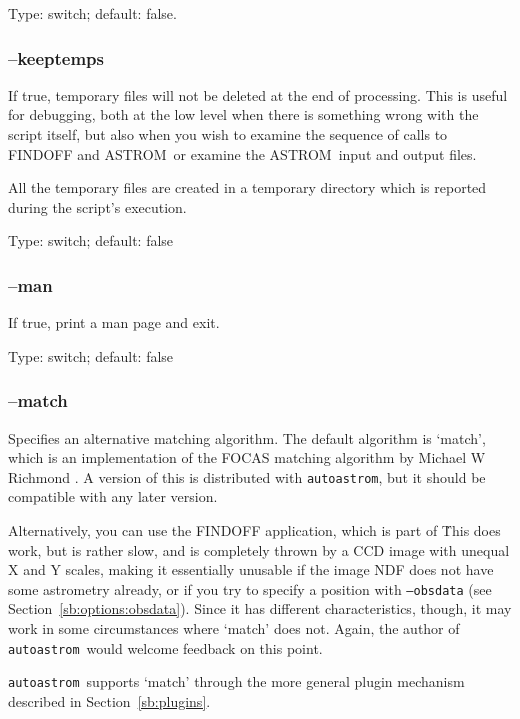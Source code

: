 \documentclass[twoside,11pt,nolof]{starlink}
\providecommand{\ASTROM}{{\footnotesize ASTROM}\normalsize}
\providecommand{\autoastrom}{\texttt{autoastrom}}
\providecommand{\CCDPACKref}{\xref{{\footnotesize CCDPACK}}{sun139}{}}
\begin{document}
Type: switch; default: false.

\subsubsection{--keeptemps\label{sb:options:keeptemps}}

If true, temporary files will not be deleted at the end of processing.  This
is useful for debugging, both at the low level when there is something wrong
with the script itself, but also when you wish to examine the sequence of
calls to FINDOFF and \ASTROM\, or examine the \ASTROM\ input and output
files.

All the temporary files are created in a temporary directory which is
reported during the script's execution.

Type: switch; default: false

\subsubsection{--man\label{sb:options:man}}

If true, print a man page and exit.

Type: switch; default: false

\subsubsection{--match\label{sb:options:match}}

Specifies an alternative matching algorithm.  The default algorithm is
`match', which is an implementation of the FOCAS matching algorithm
\cite{valdes95} by Michael W Richmond \cite{match-home}.  A version of this is
distributed with \autoastrom, but it should be compatible with any later
version.

Alternatively, you can use the FINDOFF application, which is part of
\CCDPACKref\.  This does work, but is rather slow, and is completely thrown by
a CCD image with unequal X and Y scales, making it essentially unusable if the
image NDF does not have some astrometry already, or if you try to specify a
position with \texttt{--obsdata} (see Section~\ref{sb:options:obsdata}).
Since it has different characteristics, though, it may work in some
circumstances where `match' does not.  Again, the author of \autoastrom\ would
welcome feedback on this point.

\autoastrom\ supports `match' through the more general plugin mechanism
described in Section~\ref{sb:plugins}.
\end{document}
